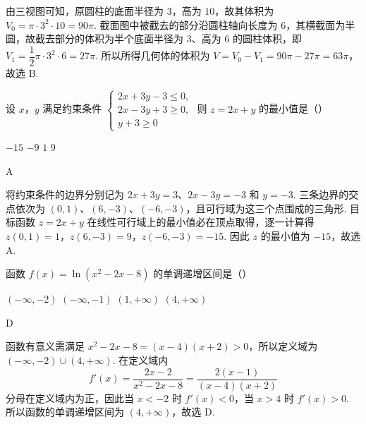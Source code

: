 \begin{solution}
由三视图可知，原圆柱的底面半径为 \(3\)，高为 \(10\)，故其体积为
\(V_0=\pi\cdot3^2\cdot10=90\pi\).
截面图中被截去的部分沿圆柱轴向长度为 \(6\)，其横截面为半圆，故截去部分的体积为半个底面半径为 \(3\)、高为 \(6\) 的圆柱体积，即
\(V_1=\dfrac12\pi\cdot3^2\cdot6=27\pi\).
所以所得几何体的体积为 \(V=V_0-V_1=90\pi-27\pi=63\pi\)，故选 B.
\end{solution}

\begin{problem}
设 \(x\)，\(y\) 满足约束条件
\(\begin{cases}
2x+3y-3\le 0,\\
2x-3y+3\ge 0,\\
y+3\ge 0
\end{cases}\)
则 \(z=2x+y\) 的最小值是（\quad）

\choices
    {\(-15\)}
    {\(-9\)}
    {\(1\)}
    {\(9\)}
\end{problem}

\begin{answer}
A
\end{answer}

\begin{solution}
将约束条件的边界分别记为
\(2x+3y=3\)、\(2x-3y=-3\) 和 \(y=-3\).
三条边界的交点依次为
\(\left(0,1\right)\)、\(\left(6,-3\right)\)、\(\left(-6,-3\right)\)，且可行域为这三个点围成的三角形.
目标函数 \(z=2x+y\) 在线性可行域上的最小值必在顶点取得，逐一计算得
\(z(0,1)=1\)，\(z(6,-3)=9\)，\(z(-6,-3)=-15\).
因此 \(z\) 的最小值为 \(-15\)，故选 A.
\end{solution}

\begin{problem}
函数 \(f(x)=\ln(x^2-2x-8)\) 的单调递增区间是（\quad）

\choices
    {\((-\infty,-2)\)}
    {\((-\infty,-1)\)}
    {\((1,+\infty)\)}
    {\((4,+\infty)\)}
\end{problem}

\begin{answer}
D
\end{answer}

\begin{solution}
函数有意义需满足
\(x^2-2x-8=(x-4)(x+2)>0\)，所以定义域为 \((-\infty,-2)\cup(4,+\infty)\).
在定义域内
\[
f'(x)=\frac{2x-2}{x^2-2x-8}=\frac{2(x-1)}{(x-4)(x+2)}
\]
分母在定义域内为正，因此当 \(x<-2\) 时 \(f'(x)<0\)，当 \(x>4\) 时 \(f'(x)>0\).
所以函数的单调递增区间为 \((4,+\infty)\)，故选 D.
\end{solution}

